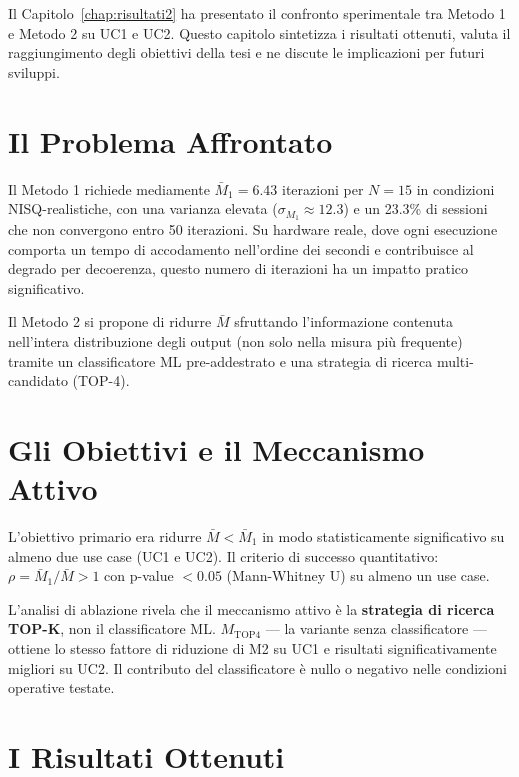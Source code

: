 \begin{onehalfspace}

Il Capitolo~\ref{chap:risultati2} ha presentato il confronto sperimentale tra Metodo 1 e Metodo 2 su UC1 e UC2. Questo capitolo sintetizza i risultati ottenuti, valuta il raggiungimento degli obiettivi della tesi e ne discute le implicazioni per futuri sviluppi.

\section{Il Problema Affrontato}
\label{sec:problema_m2}

Il Metodo 1 richiede mediamente $\bar{M}_1 = 6.43$ iterazioni per $N=15$ in condizioni NISQ-realistiche, con una varianza elevata ($\sigma_{M_1} \approx 12.3$) e un 23.3\% di sessioni che non convergono entro 50 iterazioni. Su hardware reale, dove ogni esecuzione comporta un tempo di accodamento nell'ordine dei secondi e contribuisce al degrado per decoerenza, questo numero di iterazioni ha un impatto pratico significativo.

Il Metodo 2 si propone di ridurre $\bar{M}$ sfruttando l'informazione contenuta nell'intera distribuzione degli output (non solo nella misura più frequente) tramite un classificatore \ac{ML} pre-addestrato e una strategia di ricerca multi-candidato (TOP-4).

\section{Gli Obiettivi e il Meccanismo Attivo}
\label{sec:obiettivi_m2}

L'obiettivo primario era ridurre $\bar{M} < \bar{M}_1$ in modo statisticamente significativo su almeno due use case (UC1 e UC2). Il criterio di successo quantitativo: $\rho = \bar{M}_1/\bar{M} > 1$ con p-value $< 0.05$ (Mann-Whitney U) su almeno un use case.

L'analisi di ablazione rivela che il meccanismo attivo è la \textbf{strategia di ricerca TOP-K}, non il classificatore ML. $M_{\text{TOP4}}$ --- la variante senza classificatore --- ottiene lo stesso fattore di riduzione di M2 su UC1 e risultati significativamente migliori su UC2. Il contributo del classificatore è nullo o negativo nelle condizioni operative testate.

\section{I Risultati Ottenuti}
\label{sec:risultati_m2_concl}


\end{onehalfspace}
